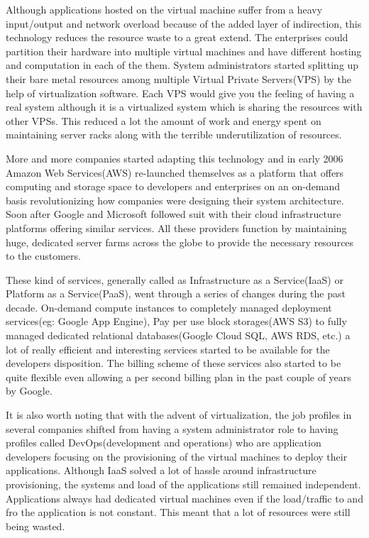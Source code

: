 \documentclass[12pt,titlepage]{article}
\begin{document}
Although applications hosted on the virtual machine suffer from a heavy
input/output and network overload because of the added layer of indirection,
this technology reduces the resource waste to a great extend. The enterprises could partition their hardware into
multiple virtual machines and have different hosting and computation in each of
the them. System administrators started splitting up their bare metal resources
among multiple Virtual Private Servers(VPS) by the help of virtualization
software. Each VPS would give you the feeling
of having a real system although it is a virtualized system which is sharing the
resources with other VPSs. This reduced a lot the amount of work and energy spent on
maintaining server racks along with the terrible underutilization of resources.

More and more companies started adapting this technology and in early 2006
Amazon Web Services(AWS) re-launched themselves as a platform that offers
computing and storage space to developers and enterprises on an on-demand basis
revolutionizing how companies were designing their system architecture. Soon
after Google and Microsoft followed suit with their cloud infrastructure
platforms offering similar services. All these providers function by maintaining
huge, dedicated server farms across the globe to provide the necessary resources
to the customers.

These kind of services, generally called as Infrastructure as a Service(IaaS) or
Platform as a Service(PaaS), went through a
series of changes during the past decade. On-demand compute instances to
completely managed deployment services(eg: Google App Engine), Pay per use block
storages(AWS S3) to fully managed dedicated relational databases(Google Cloud
SQL, AWS RDS, etc.) a lot of really efficient and interesting services started
to be available for the developers disposition. The billing scheme of these
services also started to be quite flexible even allowing a per second billing
plan in the past couple of years by Google.

It is also worth noting that with the advent of virtualization, the job profiles
in several companies shifted from having a system administrator role to
having profiles called DevOps(development and
operations) who are application developers focusing on the provisioning of the
virtual machines to deploy their applications. Although IaaS solved a lot of
hassle around infrastructure provisioning, the systems and load of the
applications still remained independent. Applications always had dedicated virtual machines
even if the load/traffic to and fro the application is not constant. This meant that a
lot of resources were still being wasted.
\end{document}
